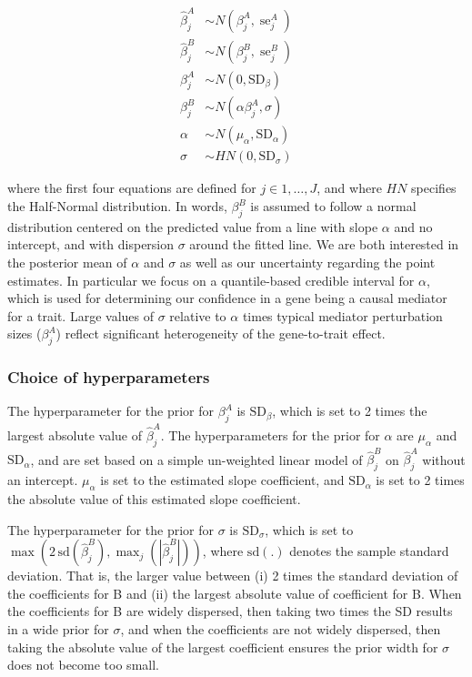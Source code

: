 \documentclass[11pt]{article}
\DeclareMathOperator{\se}{\textrm{se}}
\begin{document}
\begin{align}
  \widehat{\beta}_j^A &\sim N(\beta_j^A, \se_j^A) \\
  \widehat{\beta}_j^B &\sim N(\beta_j^B, \se_j^B) \\
  \beta_j^A &\sim N(0, \textrm{SD}_\beta) \\
  \beta_j^B &\sim N(\alpha \beta_j^A, \sigma) \\
  \alpha &\sim N(\mu_\alpha, \textrm{SD}_\alpha) \\
  \sigma &\sim HN(0, \textrm{SD}_\sigma)
\end{align}

where the first four equations are defined for $j \in 1,\dots,J$,
and where $HN$ specifies the Half-Normal distribution.
In words, $\beta_j^B$ is assumed to follow a normal distribution
centered on the predicted value from a line with slope $\alpha$ and no
intercept, and with dispersion $\sigma$ around the fitted line.
We are both interested in the posterior mean of $\alpha$ and $\sigma$
as well as our uncertainty regarding the point estimates. In
particular we focus on a quantile-based credible interval for
$\alpha$, which is used for determining our confidence in a gene being
a causal mediator for a trait. Large values of $\sigma$ relative to
$\alpha$ times typical mediator perturbation sizes ($\beta_j^A$)
reflect significant heterogeneity of the gene-to-trait effect.

\subsubsection{Choice of hyperparameters}

The hyperparameter for the prior for $\beta_j^A$ is
$\textrm{SD}_\beta$, which is set to 2 times the largest absolute value
of $\widehat{\beta}_j^A$.
The hyperparameters for the prior for $\alpha$ are
$\mu_\alpha$ and $\textrm{SD}_\alpha$, and 
are set based on a simple un-weighted linear model of
$\widehat{\beta}_j^B$ on $\widehat{\beta}_j^A$ without an intercept.
$\mu_\alpha$ is set to the estimated slope coefficient, and
$\textrm{SD}_\alpha$ is set to 2 times the absolute value of this
estimated slope coefficient.

The hyperparameter for the prior for $\sigma$ is
$\textrm{SD}_\sigma$, which is set to
$\max(2 \, \textrm{sd}(\widehat{\beta}_j^B), \max_j
(|\widehat{\beta}_j^B|))$, where $\textrm{sd}(.)$ denotes the sample
standard deviation. That is, the larger value between (i) 2 times the
standard deviation of the coefficients for B and (ii) the largest absolute
value of coefficient for B. When the coefficients for B are widely
dispersed, then taking two times the SD results in a wide prior for
$\sigma$, and when the coefficients are not widely dispersed, then
taking the absolute value of the largest coefficient ensures the prior
width for $\sigma$ does not become too small.
\end{document}
